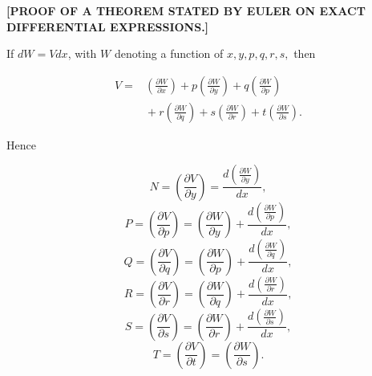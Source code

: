 \begin{center}\textbf{[PROOF OF A THEOREM STATED BY EULER ON EXACT DIFFERENTIAL EXPRESSIONS.]}\end{center}



\noindent\hspace*{\parindent}If $dW = Vdx$, with $W$ denoting a function of $x, y, p, q, r, s,$ then

\[
\begin{aligned}V ={}&\left(\frac{\partial W}{\partial x}\right) + p\left(\frac{\partial W}{\partial y}\right) + q\left(\frac{\partial W}{\partial p}\right) \\ &{}+ r\left(\frac{\partial W}{\partial q}\right) + s\left(\frac{\partial W}{\partial r}\right) + t\left(\frac{\partial W}{\partial s}\right).
\end{aligned}
\]

\par\noindent Hence

\[
N = \left(\frac{\partial V}{\partial y}\right) = \frac{d\left(\frac{\partial W}{\partial y}\right)}{dx},
\]
\[
P = \left(\frac{\partial V}{\partial p}\right) = \left(\frac{\partial W}{\partial y}\right) + \frac{d\left(\frac{\partial W}{\partial p}\right)}{dx},
\]
\[
Q = \left(\frac{\partial V}{\partial q}\right) = \left(\frac{\partial W}{\partial p}\right) + \frac{d\left(\frac{\partial W}{\partial q}\right)}{dx},
\]
\[
R = \left(\frac{\partial V}{\partial r}\right) = \left(\frac{\partial W}{\partial q}\right) + \frac{d\left(\frac{\partial W}{\partial r}\right)}{dx},
\]
\[
S = \left(\frac{\partial V}{\partial s}\right) = \left(\frac{\partial W}{\partial r}\right) + \frac{d\left(\frac{\partial W}{\partial s}\right)}{dx},
\]
\[
T = \left(\frac{\partial V}{\partial t}\right) = \left(\frac{\partial W}{\partial s}\right).
\]

